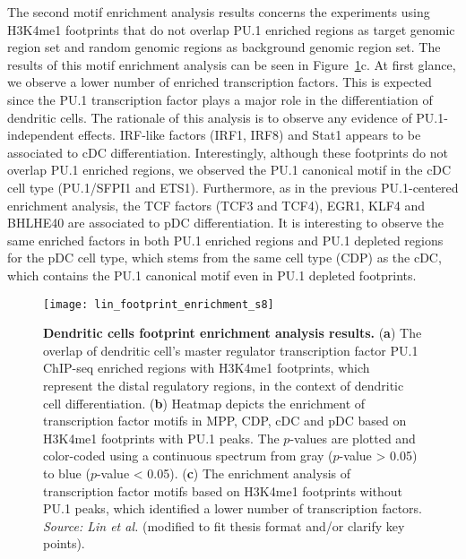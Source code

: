 The second motif enrichment analysis results concerns the experiments using H3K4me1 footprints that do not overlap PU.1 enriched regions as target genomic region set and random genomic regions as background genomic region set. The results of this motif enrichment analysis can be seen in Figure~\ref{fig:lin_footprint_enrichment_s8}c. At first glance, we observe a lower number of enriched transcription factors. This is expected since the PU.1 transcription factor plays a major role in the differentiation of dendritic cells. The rationale of this analysis is to observe any evidence of PU.1-independent effects. IRF-like factors (IRF1, IRF8) and Stat1 appears to be associated to cDC differentiation. Interestingly, although these footprints do not overlap PU.1 enriched regions, we observed the PU.1 canonical motif in the cDC cell type (PU.1/SFPI1 and ETS1). Furthermore, as in the previous PU.1-centered enrichment analysis, the TCF factors (TCF3 and TCF4), EGR1, KLF4 and BHLHE40 are associated to pDC differentiation. It is interesting to observe the same enriched factors in both PU.1 enriched regions and PU.1 depleted regions for the pDC cell type, which stems from the same cell type (CDP) as the cDC, which contains the PU.1 canonical motif even in PU.1 depleted footprints.

\begin{figure}[h!]
\centering
\texttt{[image: lin\_footprint\_enrichment\_s8]}
\caption[Dendritic cells footprint enrichment analysis results]{\textbf{Dendritic cells footprint enrichment analysis results.} (\textbf{a}) The overlap of dendritic cell's master regulator transcription factor PU.1 ChIP-seq enriched regions with H3K4me1 footprints, which represent the distal regulatory regions, in the context of dendritic cell differentiation. (\textbf{b}) Heatmap depicts the enrichment of transcription factor motifs in MPP, CDP, cDC and pDC based on H3K4me1 footprints with PU.1 peaks. The $p$-values are plotted and color-coded using a continuous spectrum from gray ($p$-value > 0.05) to blue ($p$-value < 0.05). (\textbf{c}) The enrichment analysis of transcription factor motifs based on H3K4me1 footprints without PU.1 peaks, which identified a lower number of transcription factors. \emph{Source: Lin et al.}\cite{lin2015} (modified to fit thesis format and/or clarify key points).}
\label{fig:lin_footprint_enrichment_s8}
\end{figure}

